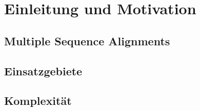 \chapter{Einleitung und Motivation}
\label{ch:einleitung}

\section{Multiple Sequence Alignments}

\section{Einsatzgebiete}

\section{Komplexität}
